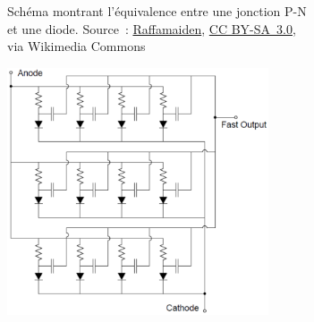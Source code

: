 \begin{figure}
    \centering
    \begin{subfigure}{0.45\textwidth}
        \centering
        \captionsetup{width=.85\textwidth}
        \caption{Schéma montrant l'équivalence entre une jonction P-N et une diode. Source~: \href{https://commons.wikimedia.org/wiki/File:PN_diode_with_electrical_symbol.svg}{Raffamaiden}, \href{https://creativecommons.org/licenses/by-sa/3.0}{CC BY-SA~3.0}, via Wikimedia Commons}
        \label{fig_pn_diode}
    \end{subfigure}
    \begin{subfigure}{0.45\textwidth}
        \centering
        \includegraphics[width=0.85\textwidth]{img/she/SiPM_arithecture.png}

\end{subfigure}
\end{figure}
